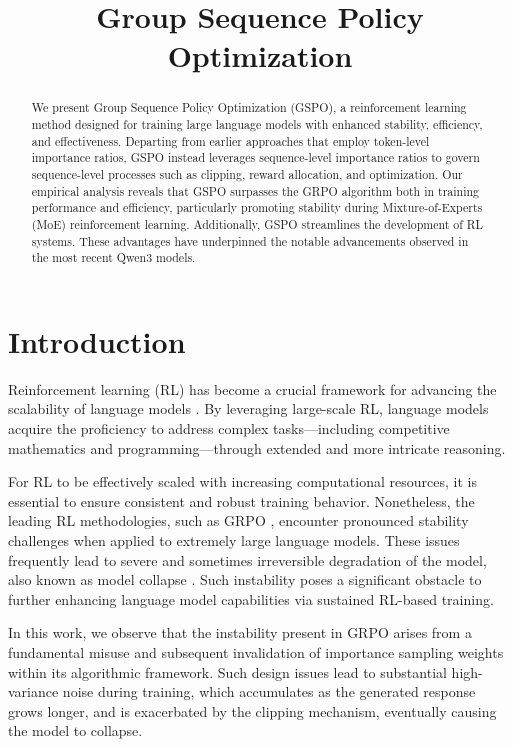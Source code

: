 \title{Group Sequence Policy Optimization}

\begin{abstract}
We present Group Sequence Policy Optimization (GSPO), a reinforcement learning method designed for training large language models with enhanced stability, efficiency, and effectiveness. Departing from earlier approaches that employ token-level importance ratios, GSPO instead leverages sequence-level importance ratios to govern sequence-level processes such as clipping, reward allocation, and optimization. Our empirical analysis reveals that GSPO surpasses the GRPO algorithm both in training performance and efficiency, particularly promoting stability during Mixture-of-Experts (MoE) reinforcement learning. Additionally, GSPO streamlines the development of RL systems. These advantages have underpinned the notable advancements observed in the most recent Qwen3 models.
\end{abstract}

\section{Introduction}
\label{sec:intro}

Reinforcement learning (RL) has become a crucial framework for advancing the scalability of language models \citep{o1,dpsk-r1,qwq32b,qwen3}. By leveraging large-scale RL, language models acquire the proficiency to address complex tasks—including competitive mathematics and programming—through extended and more intricate reasoning.

For RL to be effectively scaled with increasing computational resources, it is essential to ensure consistent and robust training behavior. Nonetheless, the leading RL methodologies, such as GRPO \citep{grpo}, encounter pronounced stability challenges when applied to extremely large language models. These issues frequently lead to severe and sometimes irreversible degradation of the model, also known as model collapse \citep{qwen3, minimax-m1}. Such instability poses a significant obstacle to further enhancing language model capabilities via sustained RL-based training.

In this work, we observe that the instability present in GRPO arises from a fundamental misuse and subsequent invalidation of importance sampling weights within its algorithmic framework. Such design issues lead to substantial high-variance noise during training, which accumulates as the generated response grows longer, and is exacerbated by the clipping mechanism, eventually causing the model to collapse.

